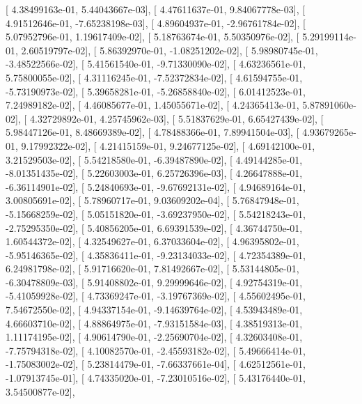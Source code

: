 \documentclass{article}
\begin{document}
       [  4.38499163e-01,   5.44043667e-03],
       [  4.47611637e-01,   9.84067778e-03],
       [  4.91512646e-01,  -7.65238198e-03],
       [  4.89604937e-01,  -2.96761784e-02],
       [  5.07952796e-01,   1.19617409e-02],
       [  5.18763674e-01,   5.50350976e-02],
       [  5.29199114e-01,   2.60519797e-02],
       [  5.86392970e-01,  -1.08251202e-02],
       [  5.98980745e-01,  -3.48522566e-02],
       [  5.41561540e-01,  -9.71330090e-02],
       [  4.63236561e-01,   5.75800055e-02],
       [  4.31116245e-01,  -7.52372834e-02],
       [  4.61594755e-01,  -5.73190973e-02],
       [  5.39658281e-01,  -5.26858840e-02],
       [  6.01412523e-01,   7.24989182e-02],
       [  4.46085677e-01,   1.45055671e-02],
       [  4.24365413e-01,   5.87891060e-02],
       [  4.32729892e-01,   4.25745962e-03],
       [  5.51837629e-01,   6.65427439e-02],
       [  5.98447126e-01,   8.48669389e-02],
       [  4.78488366e-01,   7.89941504e-03],
       [  4.93679265e-01,   9.17992322e-02],
       [  4.21415159e-01,   9.24677125e-02],
       [  4.69142100e-01,   3.21529503e-02],
       [  5.54218580e-01,  -6.39487890e-02],
       [  4.49144285e-01,  -8.01351435e-02],
       [  5.22603003e-01,   6.25726396e-03],
       [  4.26647888e-01,  -6.36114901e-02],
       [  5.24840693e-01,  -9.67692131e-02],
       [  4.94689164e-01,   3.00805691e-02],
       [  5.78960717e-01,   9.03609202e-04],
       [  5.76847948e-01,  -5.15668259e-02],
       [  5.05151820e-01,  -3.69237950e-02],
       [  5.54218243e-01,  -2.75295350e-02],
       [  5.40856205e-01,   6.69391539e-02],
       [  4.36744750e-01,   1.60544372e-02],
       [  4.32549627e-01,   6.37033604e-02],
       [  4.96395802e-01,  -5.95146365e-02],
       [  4.35836411e-01,  -9.23134033e-02],
       [  4.72354389e-01,   6.24981798e-02],
       [  5.91716620e-01,   7.81492667e-02],
       [  5.53144805e-01,  -6.30478809e-03],
       [  5.91408802e-01,   9.29999646e-02],
       [  4.92754319e-01,  -5.41059928e-02],
       [  4.73369247e-01,  -3.19767369e-02],
       [  4.55602495e-01,   7.54672550e-02],
       [  4.94337154e-01,  -9.14639764e-02],
       [  4.53943489e-01,   4.66603710e-02],
       [  4.88864975e-01,  -7.93151584e-03],
       [  4.38519313e-01,   1.11174195e-02],
       [  4.90614790e-01,  -2.25690704e-02],
       [  4.32603408e-01,  -7.75794318e-02],
       [  4.10082570e-01,  -2.45593182e-02],
       [  5.49666414e-01,  -1.75083002e-02],
       [  5.23814479e-01,  -7.66337661e-04],
       [  4.62512561e-01,  -1.07913745e-01],
       [  4.74335020e-01,  -7.23010516e-02],
       [  5.43176440e-01,   3.54500877e-02],
\end{document}
